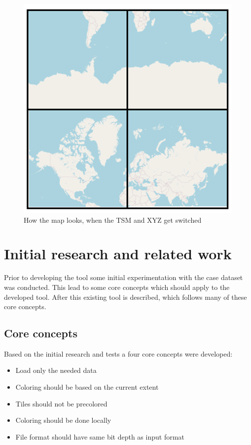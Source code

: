  
 \begin{figure} [H]
 	\centering
 	\includegraphics[width=.8\textwidth]{Pictures/SlippyInTMS}
 	\caption{How the map looks, when the TSM and XYZ get switched}
 	\label{SlippyInTMS}
 \end{figure}
 
\chapter{Initial research and related work}

Prior to developing the tool some initial experimentation with the case dataset was conducted. This lead to some core concepts which should apply to the developed tool. After this existing tool is described, which follows many of these core concepts.

\section{Core concepts}

Based on the initial research and tests a four core concepts were developed:
\begin{itemize}
 \item Load only the needed data
 \item Coloring should be based on the current extent
 \item Tiles should not be precolored
 \item Coloring should be done locally
 \item File format should have same bit depth as input format
\end{itemize}


